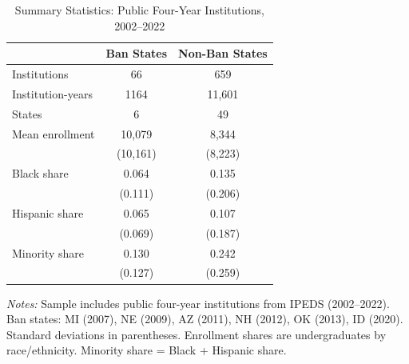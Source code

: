 \begin{table}[htbp]
\centering
\caption{Summary Statistics: Public Four-Year Institutions, 2002--2022}
\label{tab:summary}
\begin{tabular}{lcc}
\hline\hline
 & Ban States & Non-Ban States \\
\hline
Institutions & 66 & 659 \\
Institution-years & 1164 & 11,601 \\
States & 6 & 49 \\
\addlinespace
Mean enrollment & 10,079 & 8,344 \\
 & (10,161) & (8,223) \\
\addlinespace
Black share & 0.064 & 0.135 \\
 & (0.111) & (0.206) \\
Hispanic share & 0.065 & 0.107 \\
 & (0.069) & (0.187) \\
Minority share & 0.130 & 0.242 \\
 & (0.127) & (0.259) \\
\hline\hline
\end{tabular}
\begin{tablenotes}
\item \textit{Notes:} Sample includes public four-year institutions from IPEDS (2002--2022). Ban states: MI (2007), NE (2009), AZ (2011), NH (2012), OK (2013), ID (2020). Standard deviations in parentheses. Enrollment shares are undergraduates by race/ethnicity. Minority share = Black + Hispanic share.
\end{tablenotes}
\end{table}
